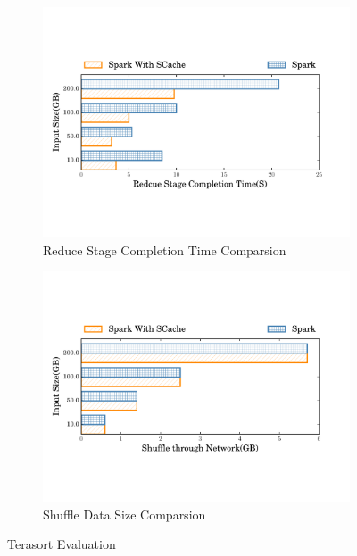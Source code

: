 
\begin{figure}
	\begin{subfigure}{\linewidth}
		\centering
		\includegraphics[width=0.9\linewidth]{fig/tera}
		\caption{Reduce Stage Completion Time Comparsion}
		\label{fig:terasort}
	\end{subfigure}
	\begin{subfigure}{\linewidth}
		\centering
		\includegraphics[width=0.9\linewidth]{fig/tera_shuffle}
		\caption{Shuffle Data Size Comparsion}
		\label{fig:terashuffle}
	\end{subfigure}
	\caption{Terasort Evaluation}
\end{figure}


